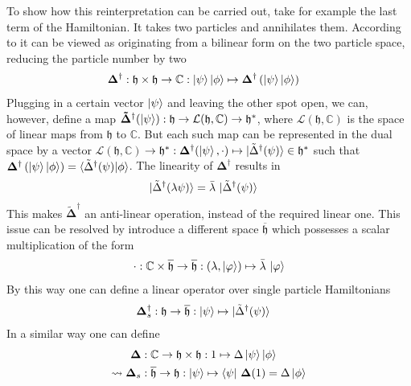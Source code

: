 To show how this reinterpretation can be carried out, take for example the last term of the Hamiltonian. It takes two particles and annihilates them. According to  it can be viewed as originating from a bilinear form on the two particle space, reducing the particle number by two 
\begin{align*}
    \mathbf{\Delta}^\dagger &: \mathfrak{h}\times\mathfrak{h}\to\mathbb{C}: \ket{\psi}\ket{\phi}\mapsto \mathbf{\Delta}^\dagger\left(\ket{\psi}\ket{\phi}\right)
\end{align*}
Plugging in a certain vector $\ket{\psi}$ and leaving the other spot open, we can, however, define a map $\mathbf{\tilde{\Delta}}^\dagger(\ket{\psi}):\mathfrak{h}\to\mathcal{L}(\mathfrak{h},\mathbb{C})\to\mathfrak{h}^*$, where $\mathcal{L}(\mathfrak{h},\mathbb{C})$ is the space of linear maps from $\mathfrak{h}$ to $\mathbb{C}$. But each such map can be represented in the dual space by a vector $\mathcal{L}(\mathfrak{h},\mathbb{C})$$\,\to \mathfrak{h}^*:\mathbf{\Delta}^\dagger(\ket{\psi},\cdot)\mapsto\ket{\tilde{\Delta}^\dagger(\psi)}\in\mathfrak{h}^*$ such that $\mathbf{\Delta}^\dagger\left(\ket{\psi}\ket{\phi}\right) = \braket{\tilde{\Delta}^\dagger(\psi)|\phi}$. The linearity of $\mathbf{\Delta}^\dagger$ results in 
\begin{align*}
    \ket{\tilde{\Delta}^\dagger(\lambda\psi)} &= \bar{\lambda}\,\ket{\tilde{\Delta}^\dagger(\psi)}
\end{align*}
This makes $\mathbf{\tilde{\Delta}}^\dagger$ an anti-linear operation, instead of the required linear one. This issue can be resolved by introduce a different space $\overline{\mathfrak{h}}$ which possesses a scalar multiplication of the form
$$\cdot: \mathbb{C}\times\overline{\mathfrak{h}}\to\overline{\mathfrak{h}}: (\lambda,\ket{\varphi})\mapsto \bar{\lambda}\,\ket{\varphi}$$
By this way one can define a linear operator over single particle Hamiltonians
\begin{align*}
    \mathbf{\Delta}_s^\dagger &: \mathfrak{h}\to\overline{\mathfrak{h}}: \ket{\psi}\mapsto \ket{\tilde{\Delta}^\dagger(\psi)}
\end{align*}
In a similar way one can define
\begin{align*}
    \mathbf{\Delta} &:\mathbb{C}\to \mathfrak{h}\times\mathfrak{h}: 1\mapsto\Delta \ket{\psi}\ket{\phi}\\
    \leadsto\mathbf{\Delta}_s &: \overline{\mathfrak{h}}\to\mathfrak{h}: \ket{\psi}\mapsto \bra{\psi}\,\mathbf{\Delta}(1)=\Delta\ket{\phi}
\end{align*}
$$
